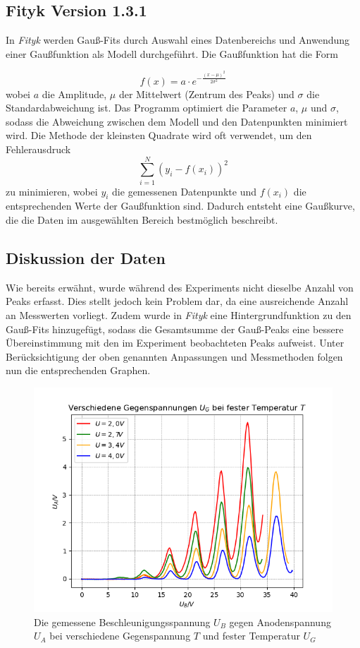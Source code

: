 \documentclass{article}
\begin{document}
\begin{multicols}{2}
\subsection*{Fityk Version 1.3.1}
In \textit{Fityk} werden Gauß-Fits durch Auswahl eines Datenbereichs und Anwendung einer Gaußfunktion als 
Modell durchgeführt. Die Gaußfunktion hat die Form 

\begin{equation*}
f(x) = a \cdot e^{-\frac{(x - \mu)^2}{2 \sigma^2}}
\end{equation*}
wobei $a$ die Amplitude, $\mu$ der Mittelwert (Zentrum des Peaks) und $\sigma$ die Standardabweichung 
ist. Das Programm optimiert die Parameter $a$, $\mu$ und $\sigma$, sodass die Abweichung zwischen dem Modell 
und den Datenpunkten minimiert wird. Die Methode der kleinsten Quadrate wird oft verwendet, um den
 Fehlerausdruck
\begin{equation*}
\sum_{i=1}^{N} (y_i - f(x_i))^2
\end{equation*}
zu minimieren, wobei $y_i$ die gemessenen Datenpunkte und $f(x_i)$ die entsprechenden Werte der Gaußfunktion 
sind. Dadurch entsteht eine Gaußkurve, die die Daten im ausgewählten Bereich bestmöglich beschreibt.
\subsection*{Diskussion der Daten}
 Wie bereits erwähnt, wurde während des Experiments nicht dieselbe Anzahl von Peaks erfasst. Dies stellt jedoch 
 kein Problem dar, da eine ausreichende Anzahl an Messwerten vorliegt. Zudem wurde in \textit{Fityk} eine 
 Hintergrundfunktion zu den Gauß-Fits hinzugefügt, sodass die Gesamtsumme der Gauß-Peaks eine bessere 
 Übereinstimmung mit den im Experiment beobachteten Peaks aufweist. Unter Berücksichtigung der oben genannten Anpassungen 
 und Messmethoden folgen nun die entsprechenden Graphen. 
\begin{figure}[H]
  \centering
  \includegraphics[scale=0.55]{FH_vieleT.png}
  \caption{Die gemessene Beschleunigungsspannung $U_B$ gegen Anodenspannung $U_A$ bei
   verschiedene Gegenspannung $T$ und fester Temperatur $U_G$}
\end{figure}
\clearpage


\end{multicols}
\end{document}
